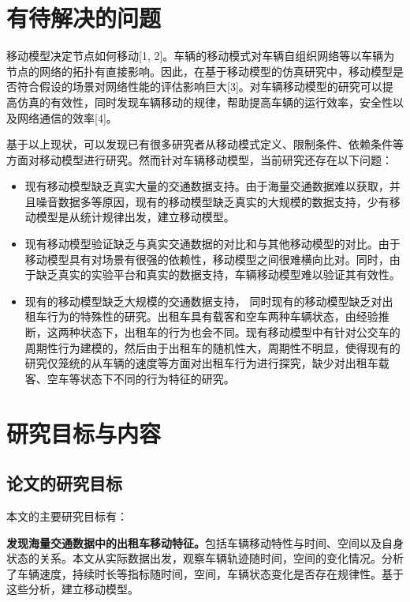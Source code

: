 \section{有待解决的问题}

移动模型决定节点如何移动[1, 2]。车辆的移动模式对车辆自组织网络等以车辆为节点的网络的拓扑有直接影响。因此，在基于移动模型的仿真研究中，移动模型是否符合假设的场景对网络性能的评估影响巨大[3]。对车辆移动模型的研究可以提高仿真的有效性，同时发现车辆移动的规律，帮助提高车辆的运行效率，安全性以及网络通信的效率[4]。

基于以上现状，可以发现已有很多研究者从移动模式定义、限制条件、依赖条件等方面对移动模型进行研究。然而针对车辆移动模型，当前研究还存在以下问题：
\begin{itemize}
  \item 
现有移动模型缺乏真实大量的交通数据支持。由于海量交通数据难以获取，并且噪音数据多等原因，现有的移动模型缺乏真实的大规模的数据支持，少有移动模型是从统计规律出发，建立移动模型。
\item 现有移动模型验证缺乏与真实交通数据的对比和与其他移动模型的对比。由于移动模型具有对场景有很强的依赖性，移动模型之间很难横向比对。同时，由于缺乏真实的实验平台和真实的数据支持，车辆移动模型难以验证其有效性。
\item



现有的移动模型缺乏大规模的交通数据支持， 同时现有的移动模型缺乏对出租车行为的特殊性的研究。出租车具有载客和空车两种车辆状态，由经验推断，这两种状态下，出租车的行为也会不同。现有移动模型中有针对公交车的周期性行为建模的，然后由于出租车的随机性大，周期性不明显，使得现有的研究仅笼统的从车辆的速度等方面对出租车行为进行探究，缺少对出租车载客、空车等状态下不同的行为特征的研究。
\end{itemize}



\section{研究目标与内容}

\subsection{论文的研究目标}
本文的主要研究目标有：

   \textbf{发现海量交通数据中的出租车移动特征。}包括车辆移动特性与时间、空间以及自身状态的关系。本文从实际数据出发，观察车辆轨迹随时间，空间的变化情况。分析了车辆速度，持续时长等指标随时间，空间，车辆状态变化是否存在规律性。基于这些分析，建立移动模型。
   
